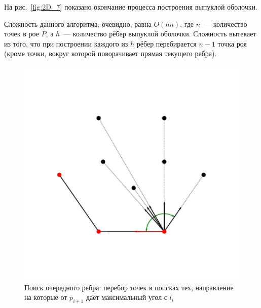 \documentclass[14pt]{extarticle}
\begin{document}
На рис.~\ref{fig:2D_7} показано окончание процесса построения выпуклой оболочки.

\medskip

Сложность данного алгоритма, очевидно, равна $O(hn)$, где $n$~--- количество точек в рое $P$, а $h$~--- количество рёбер выпуклой оболочки. Сложность вытекает из того, что при построении каждого из $h$ рёбер перебирается $n-1$ точка роя (кроме точки, вокруг которой поворачивает прямая текущего ребра).


\begin{figure}[t]
  {}\hfill%
  \begin{minipage}{0.4\textwidth}
    \centering

    \hspace*{-0.1\textwidth}\includegraphics[width=1.25\textwidth]{gift8.pdf}

    \vspace*{-7ex}

    \caption{Поиск очередного ребра: перебор точек в поисках тех, направление на которые от $p_{i+1}$ даёт максимальный угол с $l_i$}
    \label{fig:2D_5}
  \end{minipage}
  \hfill
  \begin{minipage}{0.4\textwidth}
    \centering


\end{minipage}
\end{figure}
\end{document}
